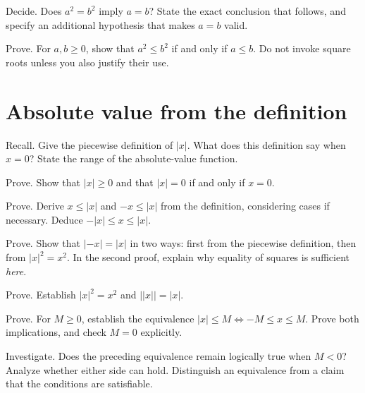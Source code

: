 \documentclass{workbook}
\begin{document}
\begin{problem}{Decide.}
Does $a^2=b^2$ imply $a=b$? State the exact conclusion that follows,
and specify an additional hypothesis that makes $a=b$ valid.
\end{problem}

\begin{problem}{Prove.}
For $a,b\geq0$, show that $a^2\leq b^2$ if and only if $a\leq b$.
Do not invoke square roots unless you also justify their use.
\end{problem}

\section{Absolute value from the definition}

\begin{problem}{Recall.}
Give the piecewise definition of $|x|$. What does this definition say
when $x=0$? State the range of the absolute-value function.
\end{problem}

\begin{problem}{Prove.}
Show that $|x|\geq0$ and that $|x|=0$ if and only if $x=0$.
\end{problem}

\begin{problem}{Prove.}
Derive $x\leq|x|$ and $-x\leq|x|$ from the definition, considering cases
if necessary. Deduce $-|x|\leq x\leq|x|$.
\end{problem}

\begin{problem}{Prove.}
Show that $|-x|=|x|$ in two ways: first from the piecewise definition,
then from $|x|^2=x^2$. In the second proof, explain why equality of
squares is sufficient \emph{here}.
\end{problem}

\begin{problem}{Prove.}
Establish $|x|^2=x^2$ and $\bigl||x|\bigr|=|x|$.
\end{problem}

\begin{problem}{Prove.}
For $M\geq0$, establish the equivalence
$|x|\leq M\iff -M\leq x\leq M$.
Prove both implications, and check $M=0$ explicitly.
\end{problem}

\begin{problem}{Investigate.}
Does the preceding equivalence remain logically true when $M<0$?
Analyze whether either side can hold. Distinguish an equivalence from a
claim that the conditions are satisfiable.
\end{problem}
\end{document}

